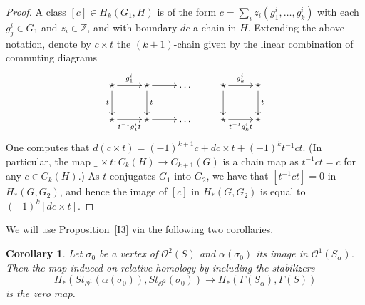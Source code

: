 \documentclass[10pt]{amsart}
\newtheorem{cor}[thm]{Corollary}
\newcommand{\OO}{\mathcal{O}}
\newcommand{\Z}{\mathbb{Z}}
\newcommand{\al}{\alpha}
\newcommand{\Ga}{\Gamma}
\newcommand{\s}{\sigma}
\newcommand{\rar}{\longrightarrow}
\newcommand{\x}{\times}
\begin{document}
\begin{proof}
A class $[c]\in H_k(G_1,H)$ is of the form $c=\sum_iz_i(g_1^i,\dots,g_k^i)$ with each  
$g^i_j\in G_1$ and $z_i\in\Z$, and with boundary $dc$ a chain in $H$. Extending the above
notation, denote by $c\times t$ the $(k+1)$-chain given by the linear combination of commuting
diagrams 
 $$\xymatrix{\star \ar[r]^{g^i_1}\ar[d]_{t} & \star\ar[d]^{t}\ar[r] & \dots & \star \ar[d]\ar[r]^{g^i_k} &
  \star \ar[d]^{t}\\
\star \ar[r]_{t^{-1}g^i_1t} & \star\ar[r] & \dots & \star \ar[r]_{t^{-1}g^i_kt} & \star}$$
One computes that $d(c\times t)=(-1)^{k+1}c+dc\times t+(-1)^kt^{-1}ct$. (In
particular, the map $\_\,\x t:C_{k}(H)\to C_{k+1}(G)$ is a chain map as $t^{-1}ct=c$
for any $c\in C_{k}(H)$.) As $t$ conjugates $G_1$ into $G_2$, we have that 
$[t^{-1}ct]=0$ in $H_*(G,G_2)$, and hence the image of $[c]$ in  $H_*(G,G_2)$ is equal to 
$(-1)^k[dc\times t]$. 
\end{proof}



We will use Proposition~\ref{I3} via the following two corollaries. 

\begin{cor}\label{I3cora}
Let $\s_0$ be a vertex of $\OO^2(S)$ and $\al(\s_0)$ its image in $\OO^1(S_\al)$. 
Then the map induced on relative homology by including the stabilizers 
$$H_*(St_{\OO^1}(\al(\s_0)),St_{\OO^2}(\s_0))\rar
H_*(\Ga(S_\al),\Ga(S))$$
is the zero map. 
\end{cor}
\end{document}
